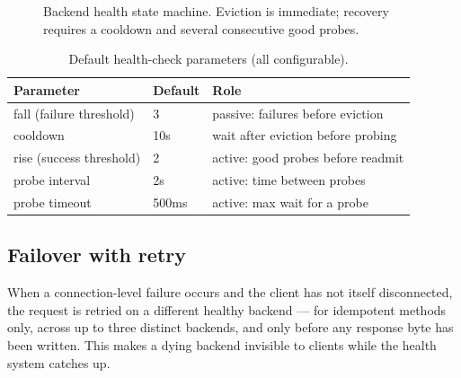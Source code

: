 \documentclass[11pt,a4paper]{report}
\begin{document}
\begin{figure}[htbp]
\centering
{}
\caption{Backend health state machine. Eviction is immediate; recovery requires a cooldown and
several consecutive good probes.}
\label{fig:health}
\end{figure}

\begin{table}[htbp]
\centering
\caption{Default health-check parameters (all configurable).}
\label{tab:health}
\begin{tabular}{lll}
\toprule
\textbf{Parameter} & \textbf{Default} & \textbf{Role}\\
\midrule
fall (failure threshold) & 3 & passive: failures before eviction\\
cooldown & 10s & wait after eviction before probing\\
rise (success threshold) & 2 & active: good probes before readmit\\
probe interval & 2s & active: time between probes\\
probe timeout & 500ms & active: max wait for a probe\\
\bottomrule
\end{tabular}
\end{table}

\subsection{Failover with retry}
When a connection-level failure occurs and the client has not itself disconnected, the request is
retried on a different healthy backend --- for idempotent methods only, across up to three
distinct backends, and only before any response byte has been written. This makes a dying backend
invisible to clients while the health system catches up.
\end{document}
